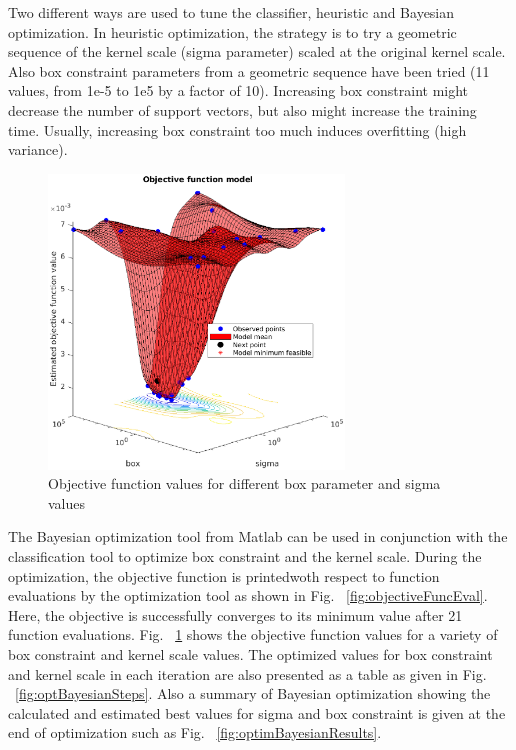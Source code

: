 Two different ways are used to tune the classifier, heuristic and Bayesian optimization. In heuristic optimization, the strategy is to try a geometric sequence of the kernel scale (sigma parameter) scaled at the original kernel scale.  
Also box constraint parameters from a geometric sequence have been tried (11 values, from 1e-5 to 1e5 by a factor of 10). Increasing box constraint might decrease the number of support vectors, but also might increase the training time. 
Usually, increasing box constraint too much induces overfitting (high variance). 

\begin{figure}
\begin{center}
\includegraphics[width=0.7\textwidth]{figures/objFuncModel}    %
\caption{Objective function values for different box parameter and sigma values} 
\label{fig:objFuncModel}
\end{center}
\end{figure}


The Bayesian optimization tool from Matlab can be used in conjunction with the classification tool to optimize box constraint and the kernel scale. 
During the optimization, the objective function is printedwoth respect to function evaluations by the optimization tool as shown in Fig. ~\ref{fig:objectiveFuncEval}. Here, the objective is successfully converges to its minimum value after 21 function evaluations.
Fig. ~\ref{fig:objFuncModel} shows the objective function values for a variety of box constraint and kernel scale values. 
The optimized values for box constraint and kernel scale in each iteration are also presented as a table as given in Fig. ~\ref{fig:optBayesianSteps}. 
Also a summary of Bayesian optimization showing the calculated and estimated best values for sigma and box constraint is given at the end of optimization such as Fig. ~\ref{fig:optimBayesianResults}.

